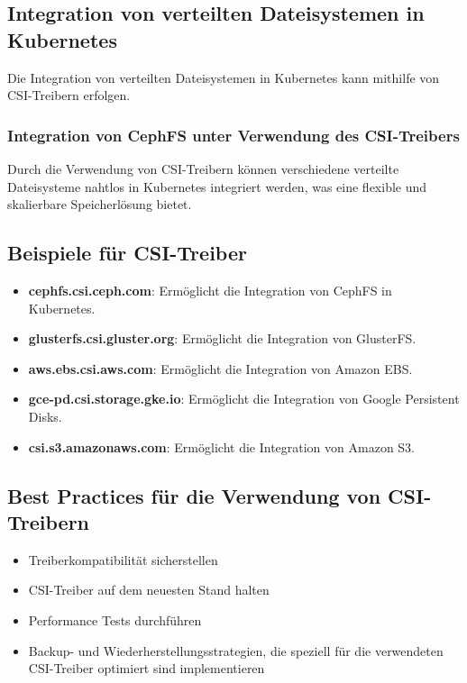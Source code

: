 \subsection{Integration von verteilten Dateisystemen in Kubernetes}
Die Integration von verteilten Dateisystemen in Kubernetes kann mithilfe von CSI-Treibern erfolgen.

\subsubsection{Integration von CephFS unter Verwendung des CSI-Treibers}


\noindent
Durch die Verwendung von CSI-Treibern können verschiedene verteilte Dateisysteme nahtlos in Kubernetes integriert werden, was eine flexible und skalierbare Speicherlösung bietet.

\subsection{Beispiele für CSI-Treiber}
\begin{itemize}
    \item \textbf{cephfs.csi.ceph.com}: Ermöglicht die Integration von CephFS in Kubernetes.
    \item \textbf{glusterfs.csi.gluster.org}: Ermöglicht die Integration von GlusterFS.
    \item \textbf{aws.ebs.csi.aws.com}: Ermöglicht die Integration von Amazon EBS.
    \item \textbf{gce-pd.csi.storage.gke.io}: Ermöglicht die Integration von Google Persistent Disks.
    \item \textbf{csi.s3.amazonaws.com}: Ermöglicht die Integration von Amazon S3.
\end{itemize}

\subsection{Best Practices für die Verwendung von CSI-Treibern}
\begin{itemize}
    \item Treiberkompatibilität sicherstellen
    \item CSI-Treiber auf dem neuesten Stand halten
    \item Performance Tests durchführen
    \item Backup- und Wiederherstellungsstrategien, die speziell für die verwendeten CSI-Treiber optimiert sind implementieren
\end{itemize}

